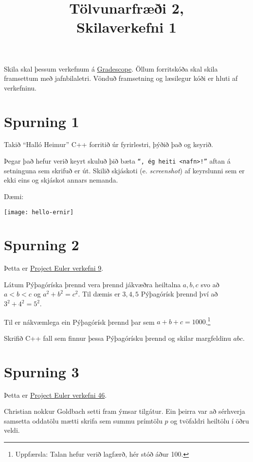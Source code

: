 \documentclass{article}
\title{Tölvunarfræði 2, \semester \\ Skilaverkefni 1}
\author{}
\begin{document}
\maketitle
{}

Skila skal þessum verkefnum á \href{https://gradescope.com/courses/5640}{Gradescope}. Öllum forritskóða skal skila framsettum með jafnbilaletri. Vönduð framsetning og læsilegur kóði er hluti af verkefninu.

\section{Spurning 1}
Takið ``Halló Heimur'' C++ forritið úr fyrirlestri, þýðið það og keyrið.

Þegar það hefur verið keyrt skuluð þið bæta \texttt{``, ég heiti <nafn>!''} aftan á setninguna sem skrifuð er út. Skilið skjáskoti (e. \emph{screenshot}) af keyrslunni sem er ekki eins og skjáskot annars nemanda.

Dæmi:
\begin{center}
\texttt{[image: hello-ernir]}
\end{center}


\section{Spurning 2}
Þetta er \href{https://projecteuler.net/problem=9}{Project Euler verkefni 9}.

Látum Pýþagóríska þrennd vera þrennd jákvæðra heiltalna $a,b,c$ svo að $a < b < c$ og $a^2 + b^2 = c^2$. Til dæmis er $3,4,5$ Pýþagórísk þrennd því að $3^2 + 4^2 = 5^2$.

Til er nákvæmlega ein Pýþagórísk þrennd þar sem $a + b + c = 1000$.\footnote{Uppfærsla: Talan hefur verið lagfærð, hér stóð áður 100.}

Skrifið C++ fall sem finnur þessa Pýþagórísku þrennd og skilar margfeldinu $abc$.

\newpage

\section{Spurning 3}
Þetta er \href{https://projecteuler.net/problem=46}{Project Euler verkefni 46}.

Christian nokkur Goldbach setti fram ýmsar tilgátur. Ein þeirra var að sérhverja samsetta oddatölu mætti skrifa sem summu prímtölu $p$ og tvöfaldri heiltölu í öðru veldi.
\end{document}
